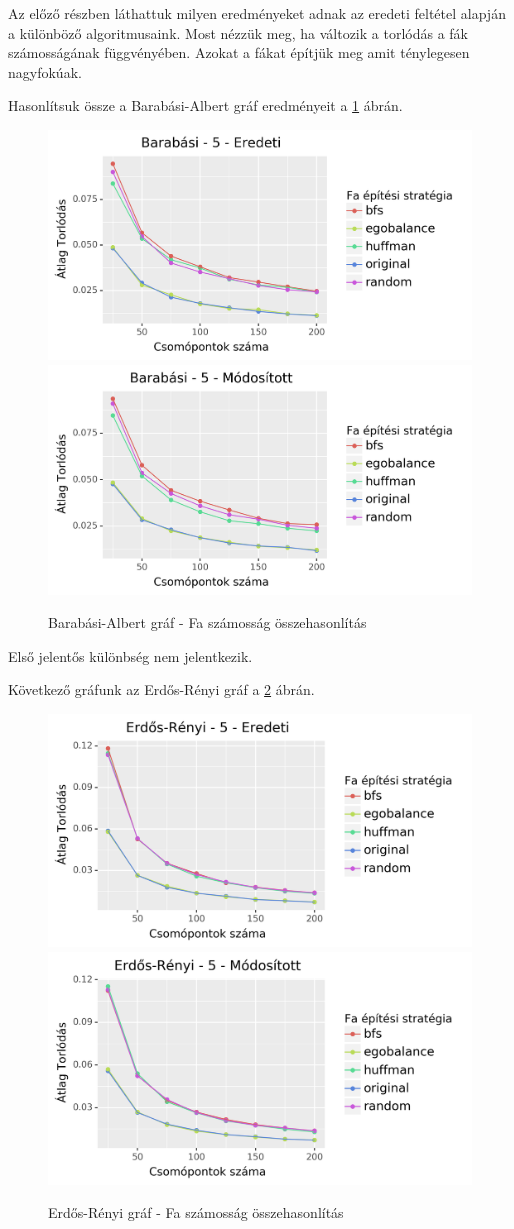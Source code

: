 \documentclass[12pt]{report}
\begin{document}
Az előző részben láthattuk milyen eredményeket adnak az eredeti feltétel alapján a különböző algoritmusaink.
Most nézzük meg, ha változik a torlódás a fák számosságának függvényében. 
Azokat a fákat építjük meg amit ténylegesen nagyfokúak.

Hasonlítsuk össze a Barabási-Albert gráf eredményeit a \ref{barabasi-tree-difference-con} ábrán.

\begin{figure}[H]
	\begin{center}
		\includegraphics[width=0.49\linewidth]{pictures/barabasi_con_e.png}
		\includegraphics[width=0.49\linewidth]{pictures/barabasi_con_m.png}
		\caption{Barabási-Albert gráf - Fa számosság összehasonlítás}
		\label{barabasi-tree-difference-con}
	\end{center}
\end{figure}

Első jelentős különbség nem jelentkezik.

Következő gráfunk az Erdős-Rényi gráf a \ref{erdos-tree-difference-con} ábrán.

\begin{figure}[H]
	\begin{center}
		\includegraphics[width=0.49\linewidth]{pictures/erdos_con_e.png}
		\includegraphics[width=0.49\linewidth]{pictures/erdos_con_m.png}
		\caption{Erdős-Rényi gráf - Fa számosság összehasonlítás}
		\label{erdos-tree-difference-con}
	\end{center}
\end{figure}
\end{document}
